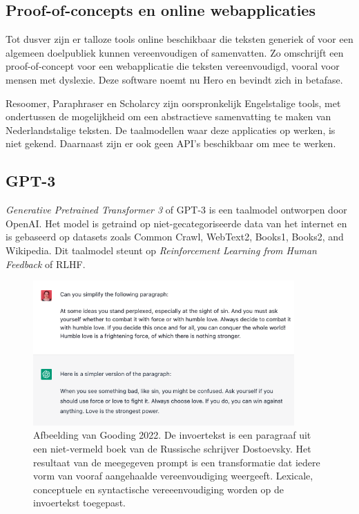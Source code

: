 
\subsection{Proof-of-concepts en online webapplicaties}

Tot dusver zijn er talloze tools online beschikbaar die teksten generiek of voor een algemeen doelpubliek kunnen vereenvoudigen of samenvatten. Zo omschrijft \textcite{Bingel2018} een proof-of-concept voor een webapplicatie die teksten vereenvoudigd, vooral voor mensen met dyslexie. Deze software noemt nu Hero en bevindt zich in betafase.

Resoomer, Paraphraser en Scholarcy zijn oorspronkelijk Engelstalige tools, met ondertussen de mogelijkheid om een abstractieve samenvatting te maken van Nederlandstalige teksten. De taalmodellen waar deze applicaties op werken, is niet gekend. Daarnaast zijn er ook geen API's beschikbaar om mee te werken. %


\subsection{GPT-3}

\textit{Generative Pretrained Transformer 3} of GPT-3 is een taalmodel ontworpen door OpenAI. Het model is getraind op niet-gecategoriseerde data van het internet en is gebaseerd op datasets zoals Common Crawl, WebText2, Books1, Books2, and Wikipedia. Dit taalmodel steunt op \textit{Reinforcement Learning from Human Feedback} of RLHF. 


\begin{figure}[H]
	\includegraphics[width=10cm]{img/chatgpt-example-simplification-gooding.png}
	\caption{Afbeelding van Gooding 2022. De invoertekst is een paragraaf uit een niet-vermeld boek van de Russische schrijver Dostoevsky. Het resultaat van de meegegeven prompt is een transformatie dat iedere vorm van vooraf aangehaalde vereenvoudiging weergeeft. Lexicale, conceptuele en syntactische vereeenvoudiging worden op de invoertekst toegepast.}
\end{figure}

